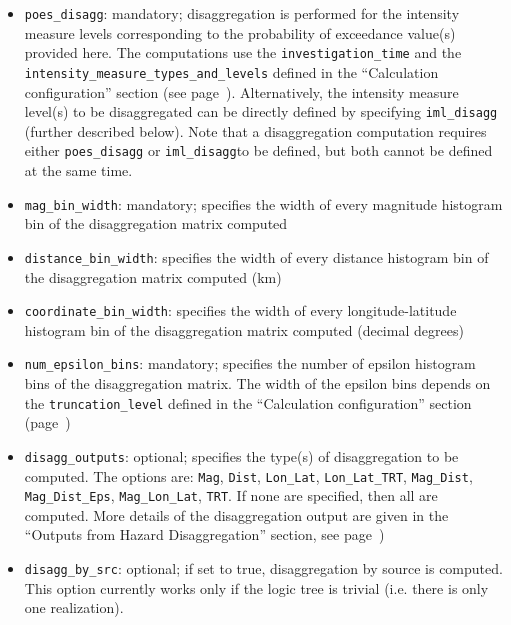 \begin{itemize}

    \item \Verb+poes_disagg+: mandatory; disaggregation is performed for the intensity
    measure levels corresponding to the probability of exceedance value(s) provided
    here. The computations use the \texttt{investigation\_time} and the
    \texttt{intensity_measure_types_and_levels} defined in the
    ``Calculation configuration'' section   (see page~\pageref{sec:calculation_configuration}).
    Alternatively, the intensity measure level(s) to be disaggregated can be directly defined
    by specifying \texttt{iml\_disagg} (further described below). Note that a
    disaggregation computation requires either \texttt{poes\_disagg} or
    \texttt{iml\_disagg}to be defined, but both cannot be defined at the same time.

    \item \Verb+mag_bin_width+: mandatory; specifies the width of every magnitude
     histogram bin of the disaggregation matrix computed

    \item \Verb+distance_bin_width+: specifies the width of every distance
    histogram bin of the disaggregation matrix computed (km)

    \item \Verb+coordinate_bin_width+: specifies the width of every longitude-latitude
    histogram bin of the disaggregation matrix computed (decimal degrees)

    \item \Verb+num_epsilon_bins+: mandatory; specifies the number of epsilon
    histogram bins of the disaggregation matrix. The width of the epsilon bins
    depends on the \texttt{truncation\_level} defined in the
    ``Calculation configuration'' section (page~\pageref{sec:calculation_configuration})

    \item \Verb+disagg_outputs+: optional; specifies the type(s) of disaggregation
    to be computed. The options are: \texttt{Mag}, \texttt{Dist}, \texttt{Lon\_Lat},
    \texttt{Lon\_Lat\_TRT}, \texttt{Mag\_Dist}, \texttt{Mag\_Dist\_Eps},
    \texttt{Mag\_Lon\_Lat}, \texttt{TRT}. If none are specified, then all are
    computed. More details of the disaggregation output are given in the
    ``Outputs from Hazard Disaggregation'' section,
    see page~\pageref{subsec:output_hazard_disaggregation})

    \item \Verb+disagg_by_src+: optional; if set to true, disaggregation by source is
    computed. This option currently works only if the logic tree is trivial
    (i.e. there is only one realization).

\end{itemize}

